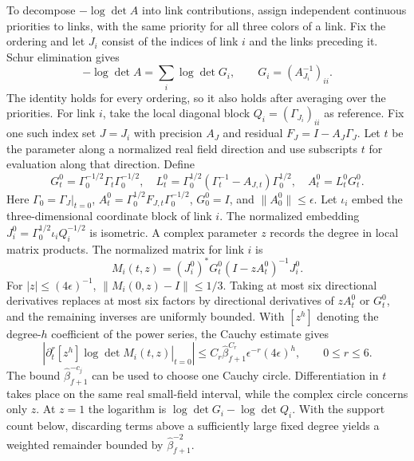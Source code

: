 \documentclass[11pt,a4paper]{article}
\numberwithin{equation}{section}
\begin{document}
To decompose \(-\log\det A\) into link contributions, assign independent continuous priorities to links, with the same priority for all three colors of a link. Fix the ordering and let \(J_i\) consist of the indices of link \(i\) and the links preceding it. Schur elimination gives
\[
       -\log\det A=\sum_i\log\det G_i,\qquad
       G_i=(A_{J_i}^{-1})_{ii}.
\]
The identity holds for every ordering, so it also holds after averaging over the priorities. For link \(i\), take the local diagonal block \(Q_i=(\Gamma_{J_i})_{ii}\) as reference. Fix one such index set \(J=J_i\) with precision \(A_J\) and residual \(F_J=I-A_J\Gamma_J\). Let \(t\) be the parameter along a normalized real field direction and use subscripts \(t\) for evaluation along that direction. Define
\[
 G_t^0=\Gamma_0^{-1/2}\Gamma_t\Gamma_0^{-1/2},\quad
 L_t^0=\Gamma_0^{1/2}(\Gamma_t^{-1}-A_{J,t})\Gamma_0^{1/2},
 \quad A_t^0=L_t^0G_t^0 .
\]
Here \(\Gamma_0=\Gamma_J|_{t=0}\),
\(A_t^0=\Gamma_0^{1/2}F_{J,t}\Gamma_0^{-1/2}\),
\(G_0^0=I\), and \(\|A_0^0\|\le\epsilon\).
Let \(\iota_i\) embed the three-dimensional coordinate block of link \(i\). The normalized embedding \(J_i^0=\Gamma_0^{1/2}\iota_i Q_i^{-1/2}\) is isometric. A complex parameter \(z\) records the degree in local matrix products. The normalized matrix for link \(i\) is
\[
 M_i(t,z)=(J_i^0)^*G_t^0(I-zA_t^0)^{-1}J_i^0.
\]
For \(|z|\le (4\epsilon)^{-1}\), \(\|M_i(0,z)-I\|\le1/3\). Taking at most six directional derivatives replaces at most six factors by directional derivatives of \(zA_t^0\) or \(G_t^0\), and the remaining inverses are uniformly bounded. With \([z^h]\) denoting the degree-\(h\) coefficient of the power series, the Cauchy estimate gives
\begin{equation}
 \left|\left.\partial_t^r[z^h]\log\det M_i(t,z)\right|_{t=0}\right|
       \le C_r\widehat\beta_{f+1}^{C_r}\epsilon^{-r}(4\epsilon)^h,
       \qquad 0\le r\le6 .
 \label{eq:geom-cauchy}
\end{equation}
The bound \(\widehat\beta_{f+1}^{-c_j}\) can be used to choose one Cauchy circle. Differentiation in \(t\) takes place on the same real small-field interval, while the complex circle concerns only \(z\). At \(z=1\) the logarithm is \(\log\det G_i-\log\det Q_i\). With the support count below, discarding terms above a sufficiently large fixed degree yields a weighted remainder bounded by \(\widehat\beta_{f+1}^{-2}\).
\end{document}
